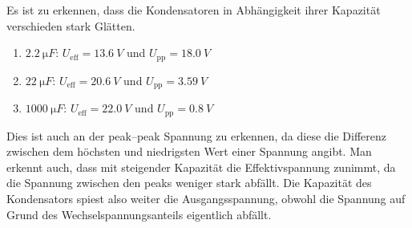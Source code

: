 \documentclass[a4paper,10pt]{article}
\numberwithin{equation}{section}
\begin{document}
Es ist zu erkennen, dass die Kondensatoren in Abhängigkeit ihrer Kapazität verschieden stark Glätten.
\begin{enumerate}[label=--]
        \item $\SI{2.2}{\micro F}$: $U_\text{eff}=\SI{13.6}{V}$ und $U_\text{pp}=\SI{18.0}{V}$ 
        \item $\SI{22}{\micro F}$: $U_\text{eff}=\SI{20.6}{V}$ und $U_\text{pp}=\SI{3.59}{V}$ 
        \item $\SI{1000}{\micro F}$: $U_\text{eff}=\SI{22.0}{V}$ und $U_\text{pp}=\SI{0.8}{V}$ 
\end{enumerate}
Dies ist auch an der peak--peak Spannung zu erkennen, da diese die Differenz zwischen dem höchsten und niedrigsten Wert einer Spannung angibt.
Man erkennt auch, dass mit steigender Kapazität die Effektivspannung zunimmt, da die Spannung zwischen den peaks weniger stark abfällt.
Die Kapazität des Kondensators spiest also weiter die Ausgangsspannung, obwohl die Spannung auf Grund des Wechselspannungsanteils eigentlich abfällt.
\end{document}
